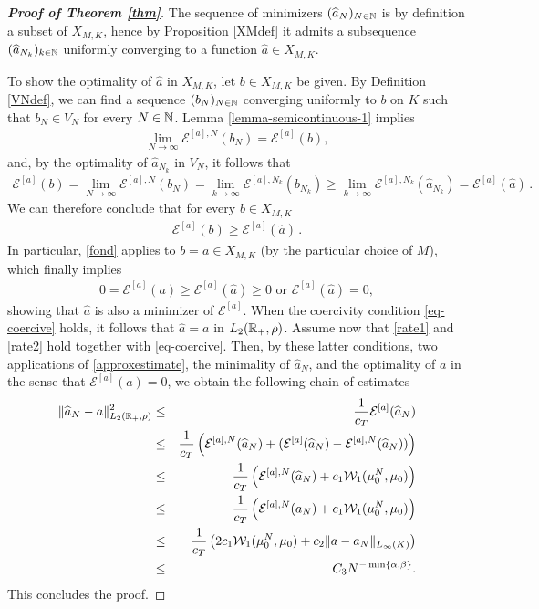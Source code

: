 \begin{proof}[\normalfont\bf Proof of Theorem \ref{thm}]

	The sequence of minimizers $(\widehat a_N)_{N \in \mathbb{N}}$ is by definition a subset of $X_{M,K}$, hence by Proposition \ref{XMdef} it admits a subsequence $(\widehat a_{N_k})_{k \in \mathbb{N}}$ uniformly converging to a function $\widehat a \in X_{M,K}$.
	
	To show the optimality of $\widehat a$ in $X_{M,K}$, let $b\in X_{M,K}$ be given. By Definition \ref{VNdef}, we can find a sequence $(b_N)_{N \in \mathbb{N}}$ converging uniformly to $b$ on $K$ such that $b_N\in V_N$ for every $N\in \mathbb{N}$. Lemma \ref{lemma-semicontinuous-1} implies
	\begin{align*}
		\lim_{N\rightarrow\infty} \mathcal E^{[a],N}(b_{N})= \mathcal E^{[a]}(b),
	\end{align*}	
	and, by the optimality of $\widehat a_{N_k}$ in $V_N$, it follows that
	\begin{align*}
		\mathcal E^{[a]} (b)=\lim_{N\rightarrow\infty}\mathcal E^{[a],N}(b_N)
			= \lim_{k \rightarrow\infty}\mathcal E^{[a],N_k}(b_{N_k})
			\geq\lim_{k \rightarrow\infty}\mathcal E^{[a],N_k}(\widehat a_{N_k})
			= \mathcal E^{[a]} (\widehat a)\,.
	\end{align*}
	We can therefore conclude that for every $b \in X_{M,K}$
	\begin{align}\label{fond}
		 \mathcal E^{[a]} (b)\geq \mathcal E^{[a]} (\widehat a)\,.
	\end{align}
 In particular, \eqref{fond} applies to $b=a\in X_{M,K}$ (by the particular choice of $M$), which finally implies
	\begin{align*}
		0=\mathcal E^{[a]} (a)\geq \mathcal E^{[a]} (\widehat a)\geq 0 \mbox { or } \mathcal E^{[a]} (\widehat a)=0,
	\end{align*}
	showing that $\widehat a$ is also a minimizer of $\mathcal E^{[a]}$. When the coercivity condition \eqref{eq-coercive} holds,  it follows that $\widehat a=a$ in $L_2(\mathbb{R}_+,\rho)$.
Assume now that \eqref{rate1} and \eqref{rate2} hold together with  \eqref{eq-coercive}. Then, by these latter conditions, two applications of \eqref{approxestimate}, the minimality of $\widehat a_N$, and the optimality of
$a$ in the sense that $\mathcal E^{[a]}(a)=0$, we obtain the following chain of estimates
\begin{eqnarray*}
\| \widehat a_N - a \|_{L_2(\mathbb{R}_+,\rho)}^2 &\leq& \frac{1}{c_T}  \mathcal E^{[a]}(\widehat a_N) \\
&\leq& \frac{1}{c_T} \left ( \mathcal E^{[a],N}(\widehat a_N) + ( \mathcal E^{[a]}(\widehat a_N)- \mathcal E^{[a],N}(\widehat a_N))  \right )\\
&\leq & \frac{1}{c_T} \left (\mathcal E^{[a],N}(\widehat a_N) +  c_1 \mathcal W_1(\mu_0^N,\mu_0) \right ) \\
&\leq &\frac{1}{c_T} \left (\mathcal E^{[a],N}(a_N) +  c_1 \mathcal W_1(\mu_0^N,\mu_0) \right ) \\
&\leq &\frac{1}{c_T} \left (2 c_1 \mathcal W_1(\mu_0^N,\mu_0) + c_2 \| a - a_N \|_{L_\infty(K)} \right ) \\
&\leq & C_3  N^{-\min \{\alpha,\beta\}}.
\end{eqnarray*} 
This concludes the proof.
\end{proof}